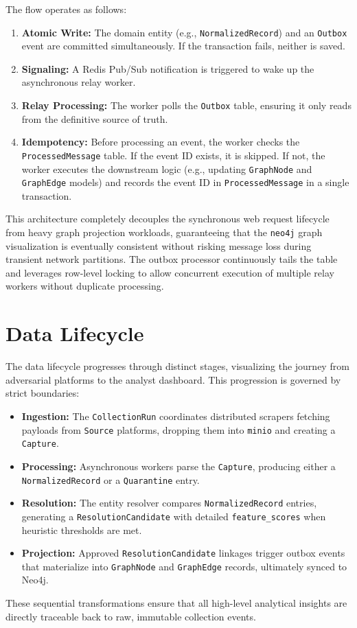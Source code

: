 The flow operates as follows:
\begin{enumerate}
    \item \textbf{Atomic Write:} The domain entity (e.g., \texttt{NormalizedRecord}) and an \texttt{Outbox} event are committed simultaneously. If the transaction fails, neither is saved.
    \item \textbf{Signaling:} A Redis Pub/Sub notification is triggered to wake up the asynchronous relay worker.
    \item \textbf{Relay Processing:} The worker polls the \texttt{Outbox} table, ensuring it only reads from the definitive source of truth.
    \item \textbf{Idempotency:} Before processing an event, the worker checks the \texttt{ProcessedMessage} table. If the event ID exists, it is skipped. If not, the worker executes the downstream logic (e.g., updating \texttt{GraphNode} and \texttt{GraphEdge} models) and records the event ID in \texttt{ProcessedMessage} in a single transaction.
\end{enumerate}

This architecture completely decouples the synchronous web request lifecycle from heavy graph projection workloads, guaranteeing that the \texttt{neo4j} graph visualization is eventually consistent without risking message loss during transient network partitions. The outbox processor continuously tails the table and leverages row-level locking to allow concurrent execution of multiple relay workers without duplicate processing.

\section{Data Lifecycle}
\label{sec:data-lifecycle}
The data lifecycle progresses through distinct stages, visualizing the journey from adversarial platforms to the analyst dashboard. This progression is governed by strict boundaries:
\begin{itemize}
    \item \textbf{Ingestion:} The \texttt{CollectionRun} coordinates distributed scrapers fetching payloads from \texttt{Source} platforms, dropping them into \texttt{minio} and creating a \texttt{Capture}.
    \item \textbf{Processing:} Asynchronous workers parse the \texttt{Capture}, producing either a \texttt{NormalizedRecord} or a \texttt{Quarantine} entry.
    \item \textbf{Resolution:} The entity resolver compares \texttt{NormalizedRecord} entries, generating a \texttt{ResolutionCandidate} with detailed \texttt{feature\_scores} when heuristic thresholds are met.
    \item \textbf{Projection:} Approved \texttt{ResolutionCandidate} linkages trigger outbox events that materialize into \texttt{GraphNode} and \texttt{GraphEdge} records, ultimately synced to Neo4j.
\end{itemize}
These sequential transformations ensure that all high-level analytical insights are directly traceable back to raw, immutable collection events.

